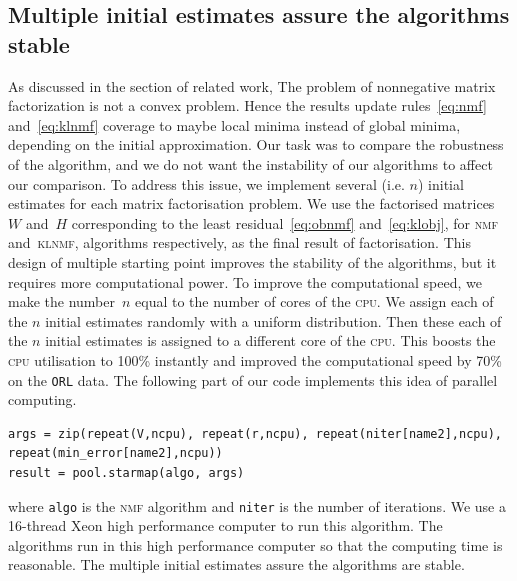 \subsection{Multiple initial estimates assure the algorithms stable}
As discussed in the section of related work,
The problem of nonnegative matrix factorization is not a convex problem.
Hence the results update rules~\eqref{eq:nmf} and~\eqref{eq:klnmf} coverage to maybe local minima instead of global minima, depending on the initial approximation.
Our task was to compare the robustness of the algorithm, and we do not want the instability of our algorithms to affect our comparison.
To address this issue, we implement several (i.e. $n$) initial estimates for each matrix factorisation problem.
We use the factorised matrices~$W$ and~$H$ corresponding to the least residual~\eqref{eq:obnmf} and~\eqref{eq:klobj}, for \textsc{nmf} and~\textsc{klnmf}, algorithms respectively, as the final result of factorisation.
This design of multiple starting point improves the stability of the algorithms, but it requires more computational power. To improve the computational speed, we make the number~$n$ equal to the number of cores of the \textsc{cpu}. We assign each of the $n$ initial estimates randomly with a uniform distribution. Then these each of the $n$ initial estimates is assigned to a different core of the \textsc{cpu}. This boosts the \textsc{cpu} utilisation to 100\% instantly and improved the computational speed by 70\% on the \texttt{ORL} data. The following part of our code implements this idea of parallel computing.
\begin{lstlisting}[caption=Centring image data, label=matn1]
args = zip(repeat(V,ncpu), repeat(r,ncpu), repeat(niter[name2],ncpu), repeat(min_error[name2],ncpu))
result = pool.starmap(algo, args)
\end{lstlisting}
where \texttt{algo} is the \textsc{nmf} algorithm and \texttt{niter} is the number of iterations. We use a 16-thread Xeon high performance computer to run this algorithm.
 The algorithms run in this high performance computer so that the computing time is reasonable.  The multiple initial estimates assure the algorithms are stable.




